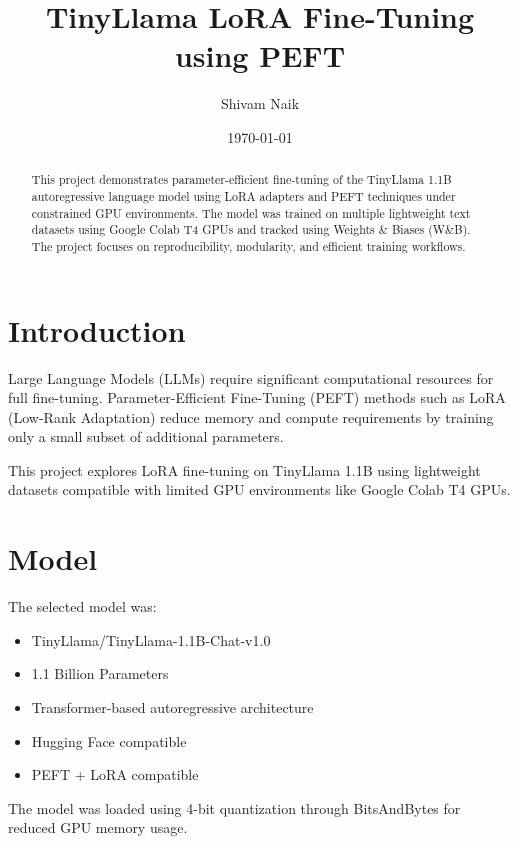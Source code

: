 \documentclass[12pt]{article}
\title{TinyLlama LoRA Fine-Tuning using PEFT}
\author{Shivam Naik}
\date{\today}
\begin{document}
\maketitle


\begin{abstract}
This project demonstrates parameter-efficient fine-tuning of the TinyLlama 1.1B autoregressive language model using LoRA adapters and PEFT techniques under constrained GPU environments. The model was trained on multiple lightweight text datasets using Google Colab T4 GPUs and tracked using Weights \& Biases (W\&B). The project focuses on reproducibility, modularity, and efficient training workflows.
\end{abstract}


\section{Introduction}

Large Language Models (LLMs) require significant computational resources for full fine-tuning. Parameter-Efficient Fine-Tuning (PEFT) methods such as LoRA (Low-Rank Adaptation) reduce memory and compute requirements by training only a small subset of additional parameters.

This project explores LoRA fine-tuning on TinyLlama 1.1B using lightweight datasets compatible with limited GPU environments like Google Colab T4 GPUs.


\section{Model}

The selected model was:

\begin{itemize}
    \item TinyLlama/TinyLlama-1.1B-Chat-v1.0
    \item 1.1 Billion Parameters
    \item Transformer-based autoregressive architecture
    \item Hugging Face compatible
    \item PEFT + LoRA compatible
\end{itemize}

The model was loaded using 4-bit quantization through BitsAndBytes for reduced GPU memory usage.
\end{document}
